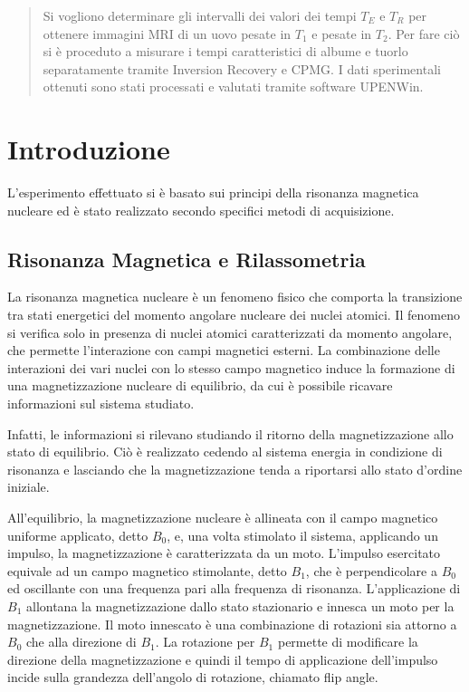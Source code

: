 \begin{abstract}

Si vogliono determinare gli intervalli dei valori dei tempi $T_E$ e $T_R$ per ottenere immagini MRI di un uovo pesate in $T_1$ e pesate in $T_2$. Per fare ciò si è proceduto a misurare i tempi caratteristici di albume e tuorlo separatamente tramite Inversion Recovery e CPMG. I dati sperimentali ottenuti sono stati processati e valutati tramite software UPENWin.

\end{abstract}

\section*{Introduzione}
L'esperimento effettuato si è basato sui principi della risonanza magnetica nucleare ed è stato realizzato secondo specifici metodi di acquisizione. 

\subsection*{Risonanza Magnetica e Rilassometria}

La risonanza magnetica nucleare è un fenomeno fisico che comporta la transizione tra stati energetici del momento angolare nucleare dei nuclei atomici.
Il fenomeno si verifica solo in presenza di nuclei atomici caratterizzati da momento angolare, che permette l'interazione con campi magnetici esterni.
La combinazione delle interazioni dei vari nuclei con lo stesso campo magnetico induce la formazione di una magnetizzazione nucleare di equilibrio, da cui è possibile ricavare informazioni sul sistema studiato.

Infatti, le informazioni si rilevano studiando il ritorno della magnetizzazione allo stato di equilibrio.
Ciò è realizzato cedendo al sistema energia in condizione di risonanza e lasciando che la magnetizzazione tenda a riportarsi allo stato d'ordine iniziale. 

All'equilibrio, la magnetizzazione nucleare è allineata con il campo magnetico uniforme applicato, detto $B_0$, e, una volta stimolato il sistema, applicando un impulso, la magnetizzazione è caratterizzata da un moto.
L'impulso esercitato equivale ad un campo magnetico stimolante, detto $B_1$, che è perpendicolare a $B_0$ ed oscillante con una frequenza pari alla frequenza di risonanza. 
L'applicazione di $B_1$ allontana la magnetizzazione dallo stato stazionario e innesca un moto per la magnetizzazione.
Il moto innescato è una combinazione di rotazioni sia attorno a $B_0$ che alla direzione di $B_1$.
La rotazione per $B_1$ permette di modificare la direzione della magnetizzazione e quindi il tempo di applicazione dell'impulso incide sulla grandezza dell'angolo di rotazione, chiamato flip angle.


